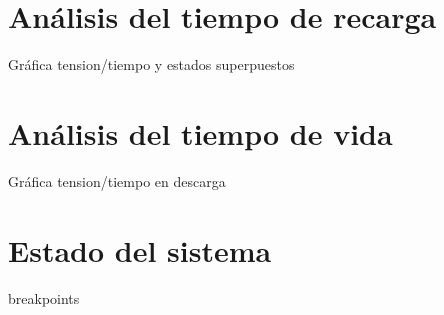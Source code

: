\section{Análisis del tiempo de recarga}
\label{sec:recarga}
Gráfica tension/tiempo y estados superpuestos

\section{Análisis del tiempo de vida}
\label{sec:vida}
Gráfica tension/tiempo en descarga

\section{Estado del sistema}
\label{sec:estado}
breakpoints


